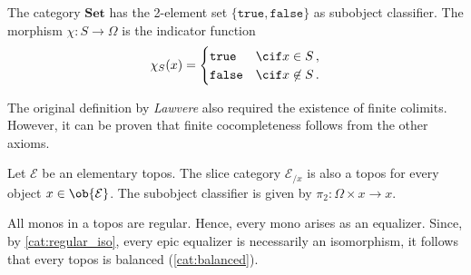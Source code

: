     \begin{example}
        The category $\mathbf{Set}$ has the 2-element set $\{\texttt{true},\texttt{false}\}$ as subobject classifier. The morphism $\chi:S\rightarrow\Omega$ is the indicator function
        \begin{gather}
            \chi_S(x)=
            \begin{cases}
                \texttt{true}&\cif x\in S\,,\\
                \texttt{false}&\cif x\not\in S\,.
            \end{cases}
        \end{gather}
    \end{example}

    \begin{remark}
        The original definition by \textit{Lawvere} also required the existence of finite colimits. However, it can be proven that finite cocompleteness follows from the other axioms.
    \end{remark}

    \begin{theorem}
        Let $\mathcal{E}$ be an elementary topos. The slice category $\mathcal{E}_{/x}$ is also a topos for every object $x\in\ob{\mathcal{E}}$. The subobject classifier is given by $\pi_2:\Omega\times x\rightarrow x$.
    \end{theorem}

    \begin{property}[Balanced]
        All monos in a topos are regular. Hence, every mono arises as an equalizer. Since, by \cref{cat:regular_iso}, every epic equalizer is necessarily an isomorphism, it follows that every topos is balanced (\cref{cat:balanced}).
    \end{property}

